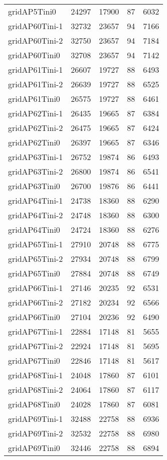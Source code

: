 \begin{longtable}{lrrrr}
gridAP5Tini0 & 24297 & 17900 & 87 & 6032 \\
gridAP60Tini-1 & 32732 & 23657 & 94 & 7166 \\
gridAP60Tini-2 & 32750 & 23657 & 94 & 7184 \\
gridAP60Tini0 & 32708 & 23657 & 94 & 7142 \\
gridAP61Tini-1 & 26607 & 19727 & 88 & 6493 \\
gridAP61Tini-2 & 26639 & 19727 & 88 & 6525 \\
gridAP61Tini0 & 26575 & 19727 & 88 & 6461 \\
gridAP62Tini-1 & 26435 & 19665 & 87 & 6384 \\
gridAP62Tini-2 & 26475 & 19665 & 87 & 6424 \\
gridAP62Tini0 & 26397 & 19665 & 87 & 6346 \\
gridAP63Tini-1 & 26752 & 19874 & 86 & 6493 \\
gridAP63Tini-2 & 26800 & 19874 & 86 & 6541 \\
gridAP63Tini0 & 26700 & 19876 & 86 & 6441 \\
gridAP64Tini-1 & 24738 & 18360 & 88 & 6290 \\
gridAP64Tini-2 & 24748 & 18360 & 88 & 6300 \\
gridAP64Tini0 & 24724 & 18360 & 88 & 6276 \\
gridAP65Tini-1 & 27910 & 20748 & 88 & 6775 \\
gridAP65Tini-2 & 27934 & 20748 & 88 & 6799 \\
gridAP65Tini0 & 27884 & 20748 & 88 & 6749 \\
gridAP66Tini-1 & 27146 & 20235 & 92 & 6531 \\
gridAP66Tini-2 & 27182 & 20234 & 92 & 6566 \\
gridAP66Tini0 & 27104 & 20236 & 92 & 6490 \\
gridAP67Tini-1 & 22884 & 17148 & 81 & 5655 \\
gridAP67Tini-2 & 22924 & 17148 & 81 & 5695 \\
gridAP67Tini0 & 22846 & 17148 & 81 & 5617 \\
gridAP68Tini-1 & 24048 & 17860 & 87 & 6101 \\
gridAP68Tini-2 & 24064 & 17860 & 87 & 6117 \\
gridAP68Tini0 & 24028 & 17860 & 87 & 6081 \\
gridAP69Tini-1 & 32488 & 22758 & 88 & 6936 \\
gridAP69Tini-2 & 32532 & 22758 & 88 & 6980 \\
gridAP69Tini0 & 32446 & 22758 & 88 & 6894 \\

\end{longtable}
